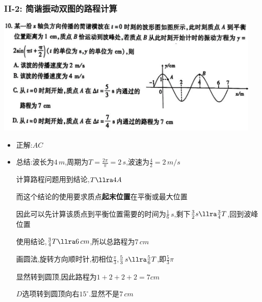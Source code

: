 \documentclass{article}
\begin{document}
\subsubsection{II-2: 简谐振动双图的路程计算}
\includegraphics[width=0.95\textwidth,keepaspectratio]{./pictures/3.13-3.png}
\begin{itemize}
    \item 正解:\quad $AC$
    \item 总结:\quad 波长为$4 \, m$,周期为$T = \frac{2 \pi}{\pi} = 2 \, s$,波速为$\frac{4}{2} = 2 \, m/s$
    
    \hspace{3.2em}计算路程问题用到结论,$T \llra 4A$

    \hspace{3.2em}而这个结论的使用要求质点\textbf{起末位置}在平衡或最大位置

    \hspace{3.2em}因此可以先计算该质点到平衡位置需要的时间为$\frac{1}{6} \, s$,剩下$\frac{3}{2}s \llra \frac{3}{4}T$,回到波峰位置

    \hspace{3.2em}使用结论,$\frac{3}{4}T \llra 6 \, cm$,所以总路程为$7 \, cm$

    \hspace{3.2em}画圆法,旋转方向顺时针,初相位$\frac{\pi}{3}$,$\frac{5}{3} \,s \llra \frac{5}{6}T$,即$\frac{5}{3} \pi$

    \hspace{3.2em}显然转到圆顶,因此路程为$1+2+2+2 = 7cm$

    \hspace{3.2em}$D$选项转到圆顶向右$15 ^ \circ$.显然不是$7 \,cm$
\end{itemize}

\vspace{2em}
\end{document}
